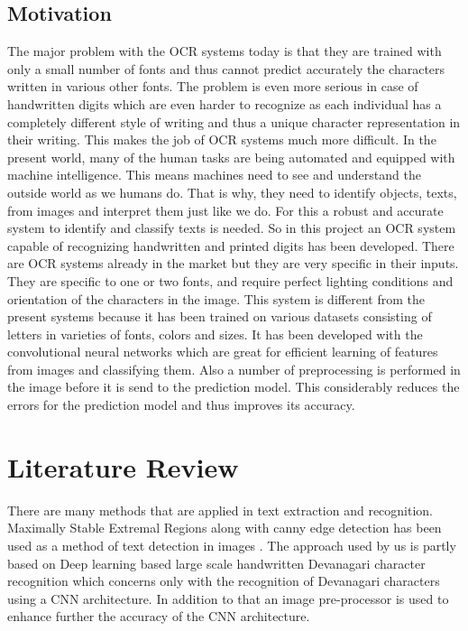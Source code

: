 \section{Motivation}
The major problem with the OCR systems today is that they are trained with only a small number of fonts and thus cannot predict accurately the characters written in various other fonts. The problem is even more serious in case of handwritten digits which are even harder to recognize as each individual has a completely different style of writing and thus a unique character representation in their writing. This makes the job of OCR systems much more difficult. 
In the present world, many of the human tasks are being automated and equipped with machine intelligence. This means machines need to see and understand the outside world as we humans do. That is why, they need to identify objects, texts, from images and interpret them just like we do. For this a robust and accurate system to identify and classify texts is needed. So in this project an OCR system capable of recognizing handwritten and printed digits has been developed. 
There are OCR systems already in the market but they are very specific in their inputs. They are specific to one or two fonts, and require perfect lighting conditions and orientation of the characters in the image.
This system is different from the present systems because it has been trained on various datasets consisting of letters in varieties of fonts, colors and sizes. It has been developed with the convolutional neural networks which are great for efficient learning of features from images and classifying them. Also a number of preprocessing is performed in the image before it is send to the prediction model. This considerably reduces the errors for the prediction model and thus improves its accuracy.

\chapter{Literature Review}
There are many methods that are applied in text extraction and recognition. Maximally Stable Extremal Regions along with canny edge detection has been used as a method of text detection in images \autocite{Huang:2016:DAO:2964284.2967282}. The approach used by us is partly based on Deep learning based large scale handwritten Devanagari character recognition \autocite{ahok_deeplearn} which concerns only with the recognition of Devanagari characters using a CNN architecture. In addition to that an image pre-processor is used to enhance further the accuracy of the CNN architecture.

